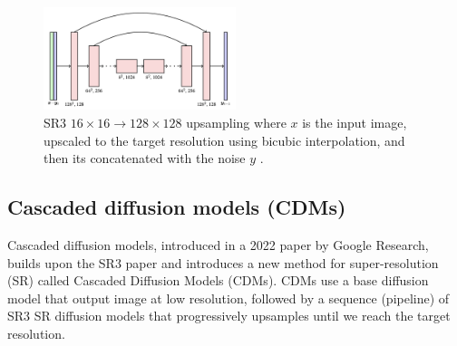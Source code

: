 

\begin{figure}
    \centering
    \includegraphics[width=0.5\textwidth]{images/imagen/sr3_architecture.png}
    \caption{SR3 $16\times 16 \rightarrow 128\times 128$ upsampling where $x$ is the input image, upscaled to the target resolution using bicubic interpolation, and then its concatenated with the noise $y$ \cite{sr3}.}
    \label{fig:sr3_architecture}
\end{figure}















\subsection{Cascaded diffusion models (CDMs)}

Cascaded diffusion models, introduced in a 2022 paper \cite{cascaded_diffusion_models} by Google Research, builds upon the SR3 paper \cite{sr3} and introduces a new method for super-resolution (SR) called Cascaded Diffusion Models (CDMs). CDMs use a base diffusion model that output image at low resolution, followed by a sequence (pipeline) of SR3 SR diffusion models that progressively upsamples until we reach the target resolution.

